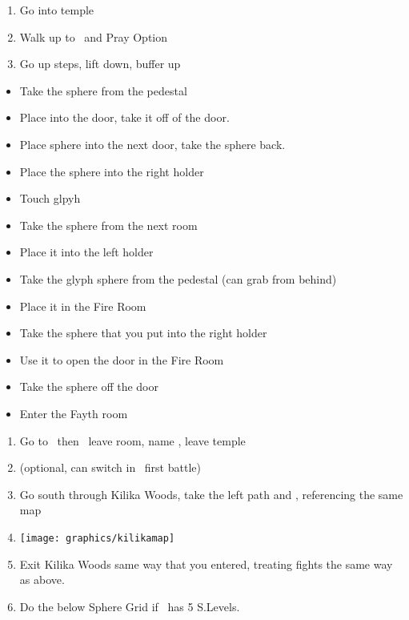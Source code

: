 \begin{enumerate}[resume]
    \item Go into temple
    \item Walk up to \wakka\ and Pray  Option
    \item Go up steps, lift down, buffer up
\end{enumerate}
\begin{trial}
    \begin{itemize}
        \item Take the sphere from the pedestal
        \item Place into the door, take it off of the door.
        \item Place sphere into the next door, take the sphere back.
        \item Place the sphere into the right holder
        \item Touch glpyh
        \item Take the sphere from the next room
        \item Place it into the left holder
        \item Take the glyph sphere from the pedestal (can grab from behind)
        \item Place it in the Fire Room
        \item Take the sphere that you put into the right holder
        \item Use it to open the door in the Fire Room
        \item Take the sphere off the door
        \item Enter the Fayth room
    \end{itemize}
\end{trial}
\begin{enumerate}[resume]
    \item Go to \wakka\, then \wakka\, leave room, name \ifrit, leave temple
    \item \formation{\tidus}{\wakka}{\lulu} (optional, can switch in \lulu\ first battle)
    \item Go south through Kilika Woods, take the left path and , referencing the same map
    \item \texttt{[image: graphics/kilikamap]}
    \item Exit Kilika Woods same way that you entered, treating fights the same way as above.
    \item Do the below Sphere Grid if \tidus\ has 5 S.Levels.
\end{enumerate}
